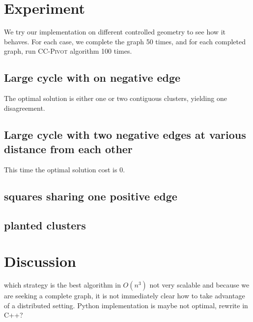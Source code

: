 \section{Experiment}

We try our implementation on different controlled geometry to see how it
behaves. For each case, we complete the graph 50 times, and for each completed
graph, run \textsc{CC-Pivot} algorithm 100 times.

\subsection{Large cycle with on negative edge}
The optimal solution is either one or two contiguous clusters, yielding one
disagreement.

\subsection{Large cycle with two negative edges at various distance from each
other}
This time the optimal solution cost is 0.

\subsection{squares sharing one positive edge}
\subsection{planted clusters}
\autocite{Makarychev2014}
\section{Discussion}
which strategy is the best
algorithm in $O(n^3)$ not very scalable and because we are seeking a complete
graph, it is not immediately clear how to take advantage of a distributed
setting. Python implementation is maybe not optimal, rewrite in C++?
